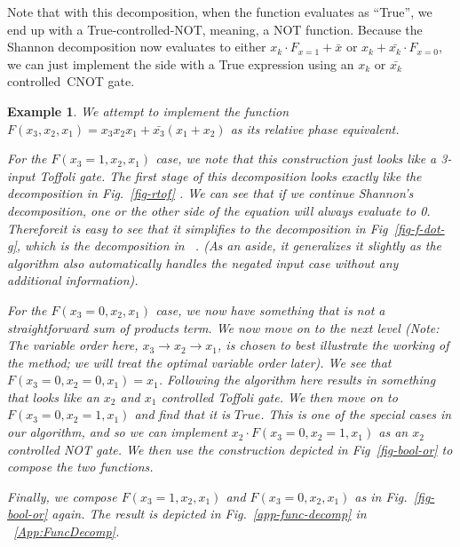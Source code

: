 \documentclass[paper]{ieice}
\newtheorem{example}{Example}
\providecommand{\DIFadd}[1]{{\protect\color{blue}{#1}}} %
\providecommand{\DIFaddbegin}{} %
\providecommand{\DIFaddend}{} %
\newcommand{\DIFaddincludegraphics}[2][]{{\color{blue}\fbox{\DIFOincludegraphics[#1]{#2}}}} %
\DeclareRobustCommand{\DIFaddbegin}{\DIFOaddbegin \let\includegraphics\DIFaddincludegraphics} %
\DeclareRobustCommand{\DIFaddend}{\DIFOaddend \let\includegraphics\DIFOincludegraphics} %
\begin{document}
Note that with this decomposition, when the function evaluates as ``True'', we end up with a True-controlled-NOT,
meaning, a NOT function. Because the Shannon decomposition now evaluates to either $x_k \cdot F_{x=1} + \bar{x}$ or
$x_k + \bar{x_k} \cdot F_{x=0}$, we can just implement the side with a True expression using an $x_k$ or
$\bar{x_k}$ controlled~CNOT gate. 

\begin{example}
  \label{ex-bool}
  We attempt to implement the function $F(x_3,x_2,x_1) = x_3x_2x_1 + \bar{x_3}(x_1 + x_2)$ as its relative phase equivalent.

  For the $F(x_3 = 1,x_2,x_1)$ case, we note that this construction just looks like a 3-input Toffoli gate. The first stage of this decomposition looks exactly like the decomposition in Fig.~\ref{fig-rtof} . We can see that if we continue Shannon's decomposition, one or the other side of the equation will always evaluate to 0. Therefore\DIFaddbegin \DIFadd{, }\DIFaddend it is easy to see that it simplifies to the
  decomposition in Fig~\ref{fig-f-dot-g}, which is the decomposition in ~\cite{bib-amy-phase-state}.
  (As an aside, it generalizes it slightly as the algorithm also automatically handles the negated input
  case without any additional information). %

  For the $F(x_3 = 0,x_2,x_1)$ case, we now have something that is not a straightforward sum of products term.
  We now move on to the next level (Note: The variable order here, $x_3 \rightarrow x_2 \rightarrow x_1$, is chosen to best illustrate the working of the method; we will treat the optimal variable order later). We see that $F(x_3 = 0,x_2=0,x_1) = x_1$. Following the algorithm here results in something that looks like an $x_2$
  and $x_1$ controlled Toffoli gate. We then move on to $F(x_3 = 0,x_2=1,x_1)$ and find that it is $True$.
  This is one of the special cases in our algorithm, and so we can implement $x_2 \cdot F(x_3 = 0,x_2=1,x_1)$
  as an $x_2$ controlled NOT gate. We then use the construction depicted in Fig~\ref{fig-bool-or} to compose
  the two functions. %

  Finally, we compose $F(x_3 = 1,x_2,x_1)$ and $F(x_3 = 0,x_2,x_1)$ as in Fig.~\ref{fig-bool-or} again. The result is depicted in Fig.~\ref{app-func-decomp} in ~\ref{App:FuncDecomp}.
\end{example}
\end{document}
